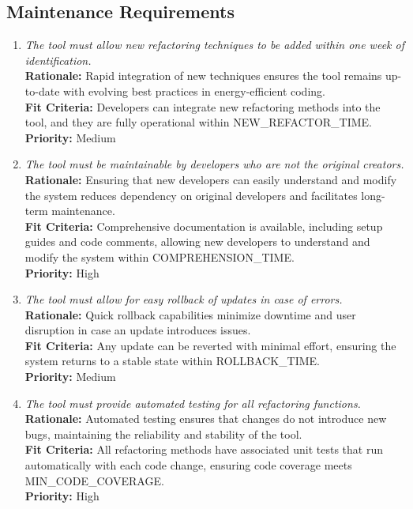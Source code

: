 \documentclass[12pt]{article}
\begin{document}
\subsection{Maintenance Requirements}
\begin{enumerate}[label=MS-MNT \arabic*., wide=0pt, leftmargin=*]
  \item \emph{The tool must allow new refactoring techniques to be
    added within one week of identification.}\\
    {\bf Rationale:} Rapid integration of new techniques ensures the
    tool remains up-to-date with evolving best practices in
    energy-efficient coding.\\
    {\bf Fit Criteria:} Developers can integrate new refactoring
    methods into the tool, and they are fully operational within
    NEW\_REFACTOR\_TIME.\\
    {\bf Priority:} Medium

  \item \emph{The tool must be maintainable by developers who are not
    the original creators.}\\
    {\bf Rationale:} Ensuring that new developers can easily
    understand and modify the system reduces dependency on original
    developers and facilitates long-term maintenance.\\
    {\bf Fit Criteria:} Comprehensive documentation is available,
    including setup guides and code comments, allowing new developers
    to understand and modify the system within COMPREHENSION\_TIME.\\
    {\bf Priority:} High

  \item \emph{The tool must allow for easy rollback of updates in
    case of errors.}\\
    {\bf Rationale:} Quick rollback capabilities minimize downtime
    and user disruption in case an update introduces issues.\\
    {\bf Fit Criteria:} Any update can be reverted with minimal
    effort, ensuring the system returns to a stable state within
    ROLLBACK\_TIME.\\
    {\bf Priority:} Medium

  \item \emph{The tool must provide automated testing for all
    refactoring functions.}\\
    {\bf Rationale:} Automated testing ensures that changes do not
    introduce new bugs, maintaining the reliability and stability of the tool.\\
    {\bf Fit Criteria:} All refactoring methods have associated unit
    tests that run automatically with each code change, ensuring code
    coverage meets MIN\_CODE\_COVERAGE.\\
    {\bf Priority:} High


\end{enumerate}
\end{document}

